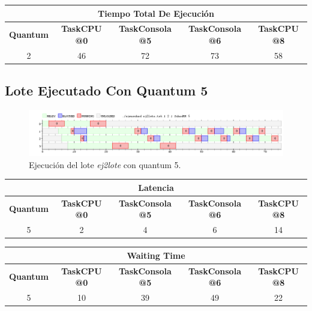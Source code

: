 \begin{center}
	\begin{tabular}{|c|c|c|c|c|}
		\hline
		\multicolumn{5}{|c|}{\textbf{Tiempo Total De Ejecución}} \\
		\hline
		\textbf{Quantum} & \textbf{TaskCPU @0} & \textbf{TaskConsola @5} & \textbf{TaskConsola @6} & \textbf{TaskCPU @8} \\
		\hline
		2 & 46 & 72 & 73 & 58 \\
		\hline
	\end{tabular}
\end{center}

\subsection{Lote Ejecutado Con Quantum 5}

\begin{figure}[!h]
	\begin{center}
		\includegraphics[width=500px]{imagenes/ej5_5.png}
		\caption{Ejecución del lote \emph{ej2lote} con quantum 5.}
		\label{fig:grafico_ej5_5}
	\end{center}
\end{figure}

\begin{center}
	\begin{tabular}{|c|c|c|c|c|}
		\hline
		\multicolumn{5}{|c|}{\textbf{Latencia}} \\
		\hline
		\textbf{Quantum} & \textbf{TaskCPU @0} & \textbf{TaskConsola @5} & \textbf{TaskConsola @6} & \textbf{TaskCPU @8} \\
		\hline
		5 & 2 & 4 & 6 & 14 \\
		\hline
	\end{tabular}
\end{center}

\begin{center}
	\begin{tabular}{|c|c|c|c|c|}
		\hline
		\multicolumn{5}{|c|}{\textbf{Waiting Time}} \\
		\hline
		\textbf{Quantum} & \textbf{TaskCPU @0} & \textbf{TaskConsola @5} & \textbf{TaskConsola @6} & \textbf{TaskCPU @8} \\
		\hline
		5 & 10 & 39 & 49 & 22 \\
		\hline
	\end{tabular}
\end{center}

